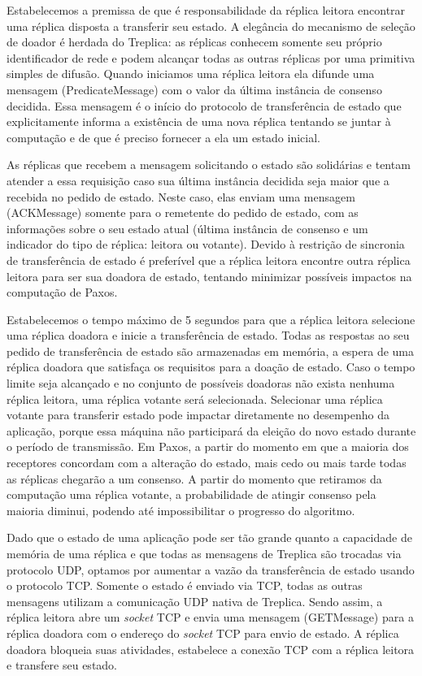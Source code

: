 Estabelecemos a premissa de que é responsabilidade da réplica leitora encontrar uma
réplica disposta a transferir seu estado. A elegância do mecanismo de seleção de doador é
herdada do Treplica: as réplicas conhecem somente seu próprio identificador de rede e
podem alcançar todas as outras réplicas por uma primitiva simples de difusão. Quando
iniciamos uma réplica leitora ela difunde uma mensagem (PredicateMessage) com o
valor da última instância de consenso decidida. Essa mensagem é o início do protocolo de
transferência de estado que explicitamente informa a existência de uma nova réplica
tentando se juntar à computação e de que é preciso fornecer a ela um estado inicial.

As réplicas que recebem a mensagem solicitando o estado são solidárias e tentam atender a
essa requisição caso sua última instância decidida seja maior que a recebida no pedido de
estado. Neste caso, elas enviam uma mensagem (ACKMessage) somente para o remetente
do pedido de estado, com as informações sobre o seu estado atual (última instância de
consenso e um indicador do tipo de réplica: leitora ou votante). Devido à restrição de
sincronia de transferência de estado é preferível que a réplica leitora encontre outra
réplica leitora para ser sua doadora de estado, tentando minimizar possíveis impactos na
computação de Paxos.

Estabelecemos o tempo máximo de 5 segundos para que a réplica leitora selecione uma
réplica doadora e inicie a transferência de estado. Todas as respostas ao seu pedido de
transferência de estado são armazenadas em memória, a espera de uma réplica doadora que
satisfaça os requisitos para a doação de estado. Caso o tempo limite seja alcançado e no
conjunto de possíveis doadoras não exista nenhuma réplica leitora, uma réplica votante
será selecionada. Selecionar uma réplica votante para transferir estado pode impactar
diretamente no desempenho da aplicação, porque essa máquina não participará da eleição do
novo estado durante o período de transmissão. Em Paxos, a partir do momento em que a
maioria dos receptores concordam com a alteração do estado, mais cedo ou mais tarde todas
as réplicas chegarão a um consenso. A partir do momento que retiramos da computação uma
réplica votante, a probabilidade de atingir consenso pela maioria diminui, podendo até
impossibilitar o progresso do algoritmo.

Dado que o estado de uma aplicação pode ser tão grande quanto a capacidade de memória de
uma réplica e que todas as mensagens de Treplica são trocadas via protocolo UDP, optamos
por aumentar a vazão da transferência de estado usando o protocolo TCP. Somente o estado é
enviado via TCP, todas as outras mensagens utilizam a comunicação UDP nativa de Treplica.
Sendo assim, a réplica leitora abre um \emph{socket} TCP e envia uma mensagem
(GETMessage) para a réplica doadora com o endereço do \emph{socket} TCP para envio de
estado. A réplica doadora bloqueia suas atividades, estabelece a conexão TCP com a réplica
leitora e transfere seu estado.


